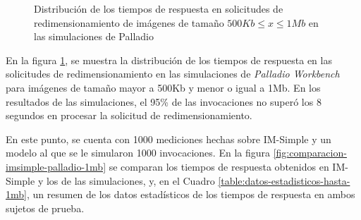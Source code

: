 \hspace{-2.0cm}
\begin{figure}
\caption{Distribución de los tiempos de respuesta en solicitudes de redimensionamiento de imágenes de tamaño $500Kb \leq x \leq 1Mb$ en las simulaciones de Palladio}
\label{fig:distribucion-simulacion-imagenes-hasta-1mb}
\end{figure}

En la figura \ref{fig:distribucion-simulacion-imagenes-hasta-1mb}, se muestra la distribución de los tiempos de respuesta en las solicitudes de redimensionamiento en las simulaciones de \emph{Palladio Workbench} para imágenes de tamaño mayor a 500Kb y menor o igual a 1Mb. En los resultados de las simulaciones, el 95\% de las invocaciones no superó los 8 segundos en procesar la solicitud de redimensionamiento.

En este punto, se cuenta con 1000 mediciones hechas sobre IM-Simple y un modelo al que se le simularon 1000 invocaciones. En la figura \ref{fig:comparacion-imsimple-palladio-1mb} se comparan los tiempos de respuesta obtenidos en IM-Simple y los de las simulaciones, y, en el Cuadro \ref{table:datos-estadisticos-hasta-1mb}, un resumen de los datos estadísticos de los tiempos de respuesta en ambos sujetos de prueba.

